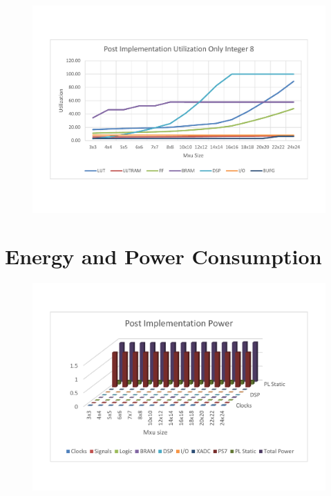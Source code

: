 \begin{figure}[!htbp]
\centering
\captionsetup{justification=centering}
\includegraphics[scale=0.5,angle=0]{./figure/graphs/graph_utilization.pdf}
\label{fig:ut8bit}
\end{figure}


\newpage
\section{Energy and Power Consumption}

\begin{figure}[!htbp]
\centering
\captionsetup{justification=centering}
\includegraphics[scale=0.5,angle=0]{./figure/graphs/graph_power.pdf}
\label{fig:pow8bit}
\end{figure}

